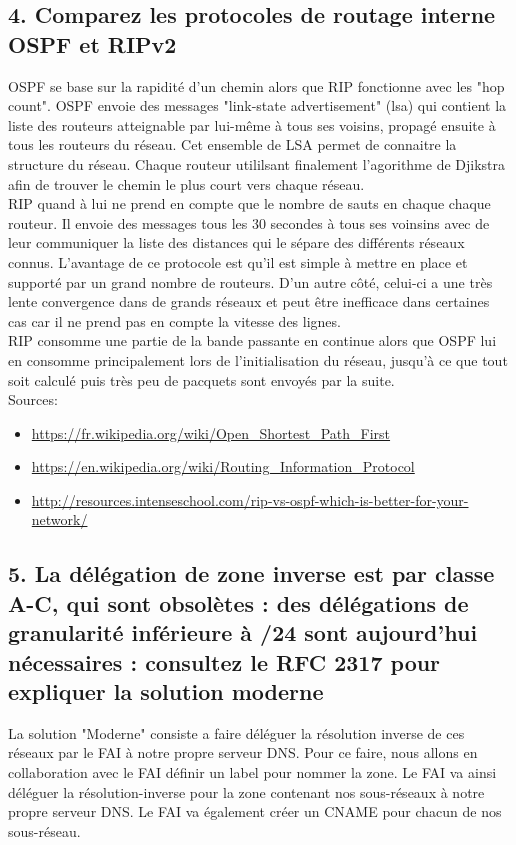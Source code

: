 \documentclass{article}
\begin{document}
\subsection*{4. Comparez les protocoles de routage interne OSPF et RIPv2}
OSPF se base sur la rapidité d'un chemin alors que RIP fonctionne avec les "hop count". OSPF envoie des messages "link-state advertisement" (lsa) qui contient la liste des routeurs atteignable par lui-même à tous ses voisins, propagé ensuite à tous les routeurs du réseau. Cet ensemble de LSA permet de connaitre la structure du réseau. Chaque routeur utililsant finalement l'agorithme de Djikstra afin de trouver le chemin le plus court vers chaque réseau.\\

RIP quand à lui ne prend en compte que le nombre de sauts en chaque chaque routeur. Il envoie des messages tous les 30 secondes à tous ses voinsins avec de leur communiquer la liste des distances qui le sépare des différents réseaux connus. L'avantage de ce protocole est qu'il est simple à mettre en place et supporté par un grand nombre de routeurs. D'un autre côté, celui-ci a une très lente convergence dans de grands réseaux et peut être inefficace dans certaines cas car il ne prend pas en compte la vitesse des lignes.\\

RIP consomme une partie de la bande passante en continue alors que OSPF lui en consomme principalement lors de l'initialisation du réseau, jusqu'à ce que tout soit calculé puis très peu de pacquets sont envoyés par la suite.\\

Sources:
\begin{itemize}
\item \url{https://fr.wikipedia.org/wiki/Open_Shortest_Path_First}
\item \url{https://en.wikipedia.org/wiki/Routing_Information_Protocol}
\item \url{http://resources.intenseschool.com/rip-vs-ospf-which-is-better-for-your-network/}
\end{itemize}

\subsection*{5. La délégation de zone inverse est par classe A-C, qui sont obsolètes : des délégations de granularité inférieure à /24 sont aujourd’hui nécessaires : consultez le RFC 2317 pour expliquer la solution moderne}
La solution "Moderne" consiste a faire déléguer la résolution inverse de ces réseaux par le FAI à notre propre serveur DNS. Pour ce faire, nous allons en collaboration avec le FAI définir un label pour nommer la zone. Le FAI va ainsi déléguer la résolution-inverse pour la zone contenant nos sous-réseaux à notre propre serveur DNS. Le FAI va également créer un CNAME pour chacun de nos sous-réseau.\\
\end{document}
